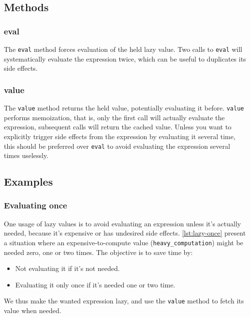 \documentclass[openright,twoside,12pt]{report}
\begin{document}
\subsection{Methods}
\subsubsection{eval}

The \lstinline|eval| method forces evaluation of the held lazy
value. Two calls to \lstinline|eval| will systematically evaluate the
expression twice, which can be useful to duplicates its side effects.

\subsubsection{value}

The \lstinline|value| method returns the held value, potentially
evaluating it before. \lstinline|value| performs memoization, that is,
only the first call will actually evaluate the expression, subsequent
calls will return the cached value. Unless you want to explicitly
trigger side effects from the expression by evaluating it several
time, this should be preferred over \lstinline|eval| to avoid
evaluating the expression several times uselessly.

\subsection{Examples}

\subsubsection{Evaluating once}

One usage of lazy values is to avoid evaluating an expression unless
it's actually needed, because it's expensive or has undesired side
effects. \autoref{lst:lazy-once} present a situation where an
expensive-to-compute value (\lstinline|heavy_computation|) might be
needed zero, one or two times. The objective is to save time by:

\begin{itemize}
\item Not evaluating it if it's not needed.
\item Evaluating it only once if it's needed one or two time.
\end{itemize}

We thus make the wanted expression lazy, and use the \lstinline|value|
method to fetch its value when needed.
\end{document}
